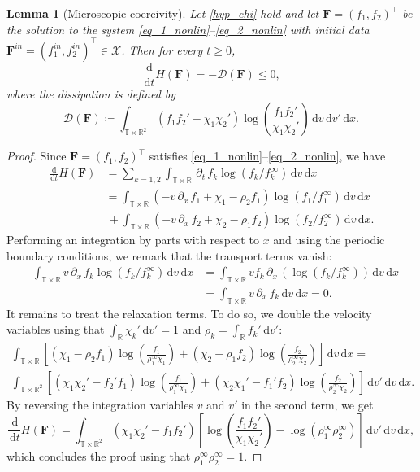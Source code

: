 \documentclass[reqno]{amsart}
\newtheorem{Lemma}{Lemma}
\newcommand{\dt}{\,\partial_t\, }
\newcommand{\dx}{\,\partial_x\, }
\newcommand{\dd}{\,\mathrm{d}}
\newcommand{\R}{\mathbb{R}}
\newcommand{\T}{\mathbb{T}}
\newcommand{\Fbf}{\mathbf{F}}
\numberwithin{equation}{section}
\begin{document}
\begin{Lemma}[Microscopic coercivity]\label{lem_microcoercivity}
Let \eqref{hyp_chi} hold and let $\Fbf=(f_1,f_2)^\top$ be the solution to the system \eqref{eq_1_nonlin}--\eqref{eq_2_nonlin} with initial data $\Fbf^{in}=(f_1^{in},f_2^{in})^\top \in \mathcal{X}$. Then for every $t\geq 0$,
\begin{equation}\label{estim.H_D}
    \frac{\dd}{\dd t}H(\Fbf)=-\mathcal{D}(\Fbf)\leq 0,
\end{equation}
where the dissipation is defined by
\begin{equation}\label{def.D}
    \mathcal{D}(\Fbf)\coloneq \int_{\T\times\R^2}(f_1f_2'-\chi_1\chi_2')\log\left( \frac{f_1f_2'}{\chi_1\chi_2'} \right)\dd v \dd v' \dd x.
\end{equation}
\end{Lemma}

\begin{proof}
Since $\Fbf=(f_1,f_2)^\top$ satisfies \eqref{eq_1_nonlin}--\eqref{eq_2_nonlin}, we have
\begin{align*}
    \frac{\dd}{\dd t}H(\Fbf)&=\sum_{k=1,2}\int_{\T\times\R}\dt f_k\log\left( f_k/f_k^\infty\right)\dd v\dd x\\
    &=\int_{\T\times\R}(-v\dx f_1+\chi_1-\rho_2f_1)\log\left( f_1/f_1^\infty\right)\dd v\dd x\\
    &\,+ \int_{\T\times\R}(-v\dx f_2+\chi_2-\rho_1f_2)\log\left( f_2/f_2^\infty\right)\dd v\dd x.
\end{align*}
Performing an integration by parts with respect to $x$ and using the periodic boundary conditions, we remark that the transport terms vanish:
\begin{equation*}
    \begin{aligned}
        -\int_{\T\times\R}v\dx f_k\log\left( f_k/f_k^\infty\right)\dd v\dd x&=\int_{\T\times\R}vf_k\dx\left(\log\left( f_k/f_k^\infty\right)\right)\dd v\dd x\\ &=\int_{\T\times\R}v\dx f_k\dd v\dd x=0.
    \end{aligned}
\end{equation*}
It remains to treat the relaxation terms. To do so, we double the velocity variables using that $\int_\R \chi_k'\dd v'=1$ and $\rho_k=\int_\R f_k'\dd v'$:
\begin{gather*}
    \int_{\T\times\R}\left[(\chi_1-\rho_2f_1)\log\left( \frac{f_1}{\rho_1^\infty\chi_1}\right)+(\chi_2-\rho_1f_2)\log\left( \frac{f_2}{\rho_2^\infty\chi_2}\right)\right]\dd v\dd x=\\
    \int_{\T\times\R^2}\left[(\chi_1\chi_2'-f_2'f_1)\log\left( \frac{f_1}{\rho_1^\infty\chi_1}\right)+(\chi_2\chi_1'-f_1'f_2)\log\left( \frac{f_2}{\rho_2^\infty\chi_2}\right)\right]\dd v'\dd v\dd x.
\end{gather*}
By reversing the integration variables $v$ and $v'$ in the second term, we get
\[\frac{\dd}{\dd t}H(\Fbf)=\int_{\T\times\R^2}(\chi_1\chi_2'-f_1f_2')\left[\log\left(\frac{f_1f_2'}{\chi_1\chi_2'}\right)-\log(\rho_1^\infty\rho_2^\infty)\right]\dd v'\dd v\dd x,\]
which concludes the proof using that $\rho_1^\infty\rho_2^\infty=1$.
\end{proof}
\end{document}
